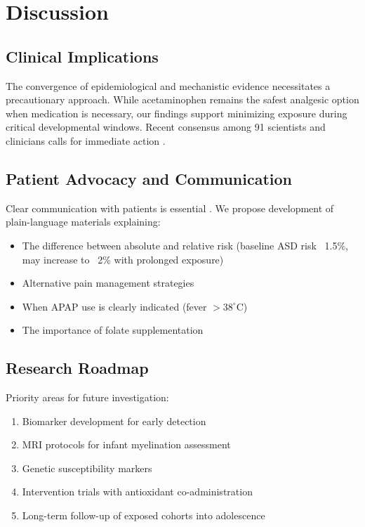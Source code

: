 \documentclass[12pt]{article}
\begin{document}
\section{Discussion}

\subsection{Clinical Implications}
The convergence of epidemiological and mechanistic evidence \citep{navarro2025,bauer2021} necessitates a precautionary approach. While acetaminophen remains the safest analgesic option when medication is necessary, our findings support minimizing exposure during critical developmental windows. Recent consensus among 91 scientists and clinicians calls for immediate action \citep{bauer2021}.

\subsection{Patient Advocacy and Communication}
Clear communication with patients is essential \citep{bauer2021}. We propose development of plain-language materials explaining:
\begin{itemize}
    \item The difference between absolute and relative risk (baseline ASD risk ~1.5\%, may increase to ~2\% with prolonged exposure) \citep{masarwa2018}
    \item Alternative pain management strategies
    \item When APAP use is clearly indicated (fever $>38^\circ$C)
    \item The importance of folate supplementation \citep{shaw2013}
\end{itemize}

\subsection{Research Roadmap}
Priority areas for future investigation:
\begin{enumerate}
    \item Biomarker development for early detection \citep{ji2020}
    \item MRI protocols for infant myelination assessment \citep{baker2020}
    \item Genetic susceptibility markers \citep{leppert2019,schultz2008}
    \item Intervention trials with antioxidant co-administration \citep{parker2020}
    \item Long-term follow-up of exposed cohorts into adolescence \citep{vlenterie2016}
\end{enumerate}
\end{document}
